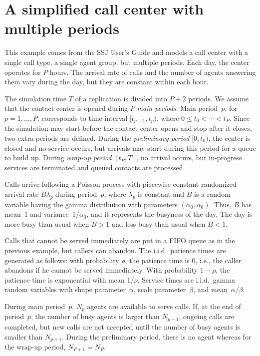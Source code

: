 \section{A simplified call center with multiple periods}
\label{sec:CallCC}

This example comes from the SSJ User's Guide \cite{iLEC04j} and models
a call center with a single call type, a single agent group, but
multiple periods.  
Each day, the center operates for $P$ hours.  The arrival rate of
calls and the number of agents answering them vary during the day, but
they are constant within each hour.  

The simulation time $T$ of a
replication is divided into $P+2$ periods. 
We assume that the contact center is opened during $P$ \emph{main
  periods}.  Main period~$p$, for $p=1,\ldots,P$, corresponds to time
interval $[t_{p-1}, t_p)$, where $0 \le t_0 < \cdots < t_P$.
Since the simulation may start before the contact center opens and
stop after it closes, two extra periods are defined.
During the \emph{preliminary period}
$[0, t_0)$, the center is closed and no service occurs, but
arrivals may start during this period for a queue to build up.
During \emph{wrap-up period} $[t_P, T]$,
no arrival occurs, but in-progress
services are terminated and queued contacts are processed.

Calls arrive following a Poisson process with piecewise-constant
randomized arrival rate $B\lambda_p$ during period~$p$, where
$\lambda_p$ is
constant and $B$ is a random variable having the gamma distribution with
parameters $(\alpha_0, \alpha_0)$.
Thus, $B$ has mean~1 and
variance~$1/\alpha_0$, and it represents the busyness of the day.
The day is more busy than usual when $B>1$ and less busy than usual
when $B<1$.

Calls that cannot be served immediately are put in a FIFO queue as in
the previous example, but callers can abandon.  The i.i.d.\ patience
times are generated as follows: with probability $\rho$, the patience
time is 0, i.e., the caller abandons if he cannot be served
immediately.  With probability $1-\rho$, the patience time is
exponential with mean $1/\nu$.  Service times are i.i.d.\ gamma random
variables with shape parameter~$\alpha$, scale parameter~$\beta$,
and mean~$\alpha/\beta$.

During main period~$p$, $N_p$ agents are available to serve calls.
If, at the end of period~$p$, the number of busy agents is
larger than $N_{p+1}$, ongoing calls are completed, but new
calls are not accepted until the number of busy agents is smaller than
$N_{p+1}$.  During the preliminary period, there is no agent whereas
for the wrap-up period, $N_{P+1}=N_P$.

